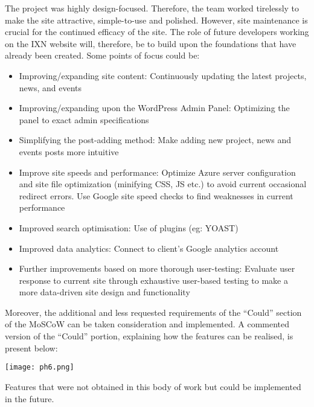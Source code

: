 \documentclass[fontsize=11pt]{extarticle}
\numberwithin{figure}{section} %
\numberwithin{table}{section}%
\providecommand{\tightlist}{%
  \setlength{\itemsep}{0pt}\setlength{\parskip}{0pt}}
\begin{document}
The project was highly design-focused. Therefore, the team worked
tirelessly to make the site attractive, simple-to-use and polished.
However, site maintenance is crucial for the continued efficacy of the
site.\cite{g8} The role of future developers working on the IXN website
will, therefore, be to build upon the foundations that have already been
created. Some points of focus could be:

\begin{itemize}
\tightlist
\item
  Improving/expanding site content: Continuously updating the latest
  projects, news, and events
\item
  Improving/expanding upon the WordPress Admin Panel: Optimizing the
  panel to exact admin specifications
\item
  Simplifying the post-adding method: Make adding new project, news and
  events posts more intuitive
\item
  Improve site speeds and performance: Optimize Azure server
  configuration and site file optimization (minifying CSS, JS etc.) to
  avoid current occasional redirect errors. Use Google site speed checks
  to find weaknesses in current performance
\item
  Improved search optimisation: Use of plugins (eg: YOAST)
\item
  Improved data analytics: Connect to client's Google analytics account
\item
  Further improvements based on more thorough user-testing: Evaluate
  user response to current site through exhaustive user-based testing to
  make a more data-driven site design and functionality
\end{itemize}

Moreover, the additional and less requested requirements of the
``Could'' section of the MoSCoW can be taken consideration and
implemented. A commented version of the ``Could'' portion, explaining
how the features can be realised, is present below:

\begin{table}[H]
      \centering
      \texttt{[image: ph6.png]}
      \caption{Features that were not obtained in this body of work but could be implemented in the future.}
 \end{table}
\newpage
\end{document}

